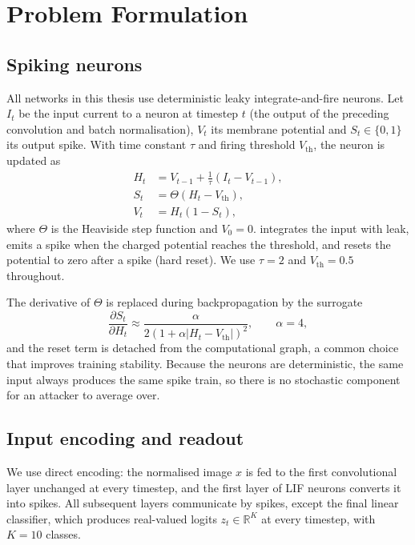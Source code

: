 \section{Problem Formulation}
\label{sec:meth-formulation}

\subsection{Spiking neurons}

All networks in this thesis use deterministic leaky integrate-and-fire neurons. Let $I_t$ be the input current to a neuron at timestep $t$ (the output of the preceding convolution and batch normalisation), $V_t$ its membrane potential and $S_t \in \{0, 1\}$ its output spike. With time constant $\tau$ and firing threshold $V_\mathrm{th}$, the neuron is updated as
\begin{align}
    H_t &= V_{t-1} + \frac{1}{\tau}\left(I_t - V_{t-1}\right), \label{eq:lif-charge}\\
    S_t &= \Theta\left(H_t - V_\mathrm{th}\right), \label{eq:lif-fire}\\
    V_t &= H_t \left(1 - S_t\right), \label{eq:lif-reset}
\end{align}
where $\Theta$ is the Heaviside step function and $V_0 = 0$.  integrates the input with leak,  emits a spike when the charged potential reaches the threshold, and  resets the potential to zero after a spike (hard reset). We use $\tau = 2$ and $V_\mathrm{th} = 0.5$ throughout.

The derivative of $\Theta$ is replaced during backpropagation by the surrogate
\begin{equation}
    \frac{\partial S_t}{\partial H_t} \approx \frac{\alpha}{2\left(1 + \alpha \left|H_t - V_\mathrm{th}\right|\right)^2}, \qquad \alpha = 4,
    \label{eq:surrogate}
\end{equation}
and the reset term is detached from the computational graph, a common choice that improves training stability. Because the neurons are deterministic, the same input always produces the same spike train, so there is no stochastic component for an attacker to average over.

\subsection{Input encoding and readout}

We use direct encoding: the normalised image $x$ is fed to the first convolutional layer unchanged at every timestep, and the first layer of LIF neurons converts it into spikes. All subsequent layers communicate by spikes, except the final linear classifier, which produces real-valued logits $z_t \in \mathbb{R}^{K}$ at every timestep, with $K = 10$ classes.

